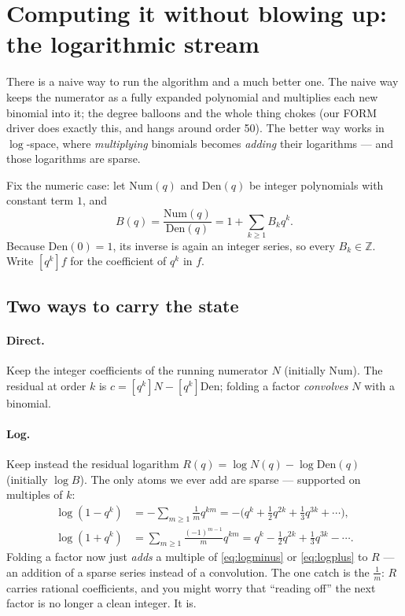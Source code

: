 \documentclass[11pt]{article}
\begin{document}
\section{Computing it without blowing up: the logarithmic stream}
\label{sec:logstream}

There is a naive way to run the algorithm and a much better one. The naive way keeps
the numerator as a fully expanded polynomial and multiplies each new binomial into
it; the degree balloons and the whole thing chokes (our FORM driver does exactly
this, and hangs around order 50). The better way works in $\log$-space, where
\emph{multiplying} binomials becomes \emph{adding} their logarithms --- and those
logarithms are sparse.

Fix the numeric case: let $\mathrm{Num}(q)$ and $\mathrm{Den}(q)$ be integer
polynomials with constant term $1$, and
\[
B(q)=\frac{\mathrm{Num}(q)}{\mathrm{Den}(q)}=1+\sum_{k\ge1}B_k q^k .
\]
Because $\mathrm{Den}(0)=1$, its inverse is again an integer series, so every
$B_k\in\mathbb{Z}$. Write $[q^k]f$ for the coefficient of $q^k$ in $f$.

\subsection{Two ways to carry the state}

\paragraph{Direct.} Keep the integer coefficients of the running numerator $N$
(initially $\mathrm{Num}$). The residual at order $k$ is
$c=[q^k]N-[q^k]\mathrm{Den}$; folding a factor \emph{convolves} $N$ with a binomial.

\paragraph{Log.} Keep instead the residual logarithm
$R(q)=\log N(q)-\log\mathrm{Den}(q)$ (initially $\log B$). The only atoms we ever add
are sparse --- supported on multiples of $k$:
\begin{align}
\log(1-q^k) &= -\sum_{m\ge1}\tfrac{1}{m}q^{km}
            = -\big(q^k+\tfrac12 q^{2k}+\tfrac13 q^{3k}+\cdots\big),\label{eq:logminus}\\
\log(1+q^k) &= \sum_{m\ge1}\tfrac{(-1)^{m-1}}{m}q^{km}
            = q^k-\tfrac12 q^{2k}+\tfrac13 q^{3k}-\cdots.\label{eq:logplus}
\end{align}
Folding a factor now just \emph{adds} a multiple of \eqref{eq:logminus} or
\eqref{eq:logplus} to $R$ --- an addition of a sparse series instead of a
convolution. The one catch is the $\tfrac1m$: $R$ carries rational coefficients, and
you might worry that ``reading off'' the next factor is no longer a clean integer.
It is.
\end{document}
